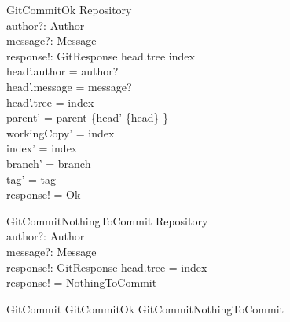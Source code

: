 \begin{schema}{GitCommitOk}
	\Delta Repository \\
	author?: Author \\
	message?: Message \\
	response!: GitResponse
\where
	head.tree \neq index \\
	head'.author = author? \\
	head'.message = message? \\
	head'.tree = index \\
	parent' = parent \cup \{head' \mapsto \{head\} \} \\
	workingCopy' = index \\
	index' = index \\
	branch' = branch \\
	tag' = tag \\
	response! = Ok
\end{schema}

\begin{schema}{GitCommitNothingToCommit}
	\Xi Repository \\
	author?: Author \\
	message?: Message \\
	response!: GitResponse
\where
	head.tree = index \\
	response! = NothingToCommit
\end{schema}

\begin{zed}
	GitCommit  GitCommitOk \lor GitCommitNothingToCommit
\end{zed}
